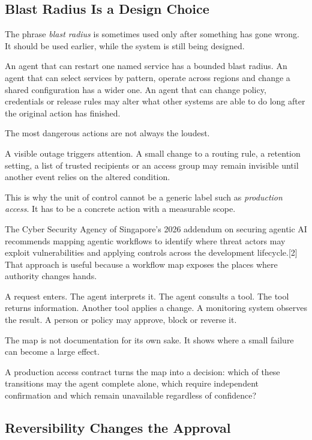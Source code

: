\subsection{Blast Radius Is a Design
Choice}\label{blast-radius-is-a-design-choice}

The phrase \emph{blast radius} is sometimes used only after something
has gone wrong. It should be used earlier, while the system is still
being designed.

An agent that can restart one named service has a bounded blast radius.
An agent that can select services by pattern, operate across regions and
change a shared configuration has a wider one. An agent that can change
policy, credentials or release rules may alter what other systems are
able to do long after the original action has finished.

The most dangerous actions are not always the loudest.

A visible outage triggers attention. A small change to a routing rule, a
retention setting, a list of trusted recipients or an access group may
remain invisible until another event relies on the altered condition.

This is why the unit of control cannot be a generic label such as
\emph{production access}. It has to be a concrete action with a
measurable scope.

The Cyber Security Agency of Singapore's 2026 addendum on securing
agentic AI recommends mapping agentic workflows to identify where threat
actors may exploit vulnerabilities and applying controls across the
development lifecycle.{[}2{]} That approach is useful because a workflow
map exposes the places where authority changes hands.

A request enters. The agent interprets it. The agent consults a tool.
The tool returns information. Another tool applies a change. A
monitoring system observes the result. A person or policy may approve,
block or reverse it.

The map is not documentation for its own sake. It shows where a small
failure can become a large effect.

A production access contract turns the map into a decision: which of
these transitions may the agent complete alone, which require
independent confirmation and which remain unavailable regardless of
confidence?

\subsection{Reversibility Changes the
Approval}\label{reversibility-changes-the-approval}

